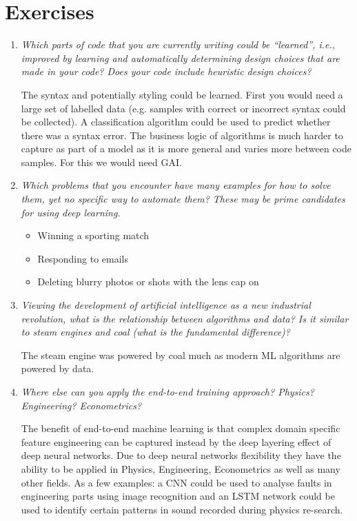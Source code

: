 \documentclass[12pt,notitlepage]{article}
\begin{document}
\section{Exercises}
\begin{enumerate}
    \item \textit{Which parts of code that you are currently writing could be “learned”, i.e.,
              improved by learning and automatically determining design choices that are made in your code? Does your code include heuristic design choices?}

          The syntax and potentially styling could be learned. First you would need a large set of labelled data (e.g. samples with correct or incorrect syntax could be collected). A classification
          algorithm could be used to predict whether there was a syntax error. The business logic of algorithms is much harder to capture
          as part of a model as it is more general and varies more between code samples. For this we would need GAI.
    \item \textit{Which problems that you encounter have many examples for how to solve them, yet no specific way to automate them? These may be prime candidates for using deep learning.}

          \begin{itemize}
              \item Winning a sporting match
              \item Responding to emails
              \item Deleting blurry photos or shots with the lens cap on
          \end{itemize}

    \item \textit{Viewing the development of artificial intelligence as a new industrial revolution, what is the relationship between algorithms and data? Is it similar to steam engines and coal (what is the fundamental difference)?}

          The steam engine was powered by coal much as modern ML algorithms are powered by data.
    \item \textit{Where else can you apply the end-to-end training approach? Physics? Engineering? Econometrics?}
          
          The benefit of end-to-end machine learning is that complex domain specific feature engineering can be captured instead by the deep layering effect of deep
          neural networks. Due to deep neural networks flexibility they have the ability to be applied in Physics, Engineering, Econometrics as well as
          many other fields. As a few examples: a CNN could be used to analyse faults in engineering parts using image recognition and an LSTM network could
          be used to identify certain patterns in sound recorded during physics re-search. 
\end{enumerate}


\vfill

\nocite{LeCun2015}
\nocite{zhang2020dive}
\end{document}

